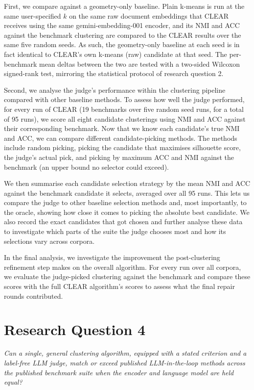 \documentclass[11pt,a4paper,oneside]{report}
\begin{document}
First, we compare against a geometry-only baseline. Plain k-means is run at the same user-specified $k$ on the same raw document embeddings that CLEAR receives using the same {\small\ttfamily gemini-embedding-001} encoder, and its NMI and ACC against the benchmark clustering are compared to the CLEAR results over the same five random seeds. As such, the geometry-only baseline at each seed is in fact identical to CLEAR's own k-means (raw) candidate at that seed. The per-benchmark mean deltas between the two are tested with a two-sided Wilcoxon signed-rank test, mirroring the statistical protocol of research question 2.

Second, we analyse the judge's performance within the clustering pipeline compared with other baseline methods. To assess how well the judge performed, for every run of CLEAR (19 benchmarks over five random seed runs, for a total of 95 runs), we score all eight candidate clusterings using NMI and ACC against their corresponding benchmark. Now that we know each candidate's true NMI and ACC, we can compare different candidate-picking methods. The methods include random picking, picking the candidate that maximises silhouette score, the judge's actual pick, and picking by maximum ACC and NMI against the benchmark (an upper bound no selector could exceed).

We then summarise each candidate selection strategy by the mean NMI and ACC against the benchmark candidate it selects, averaged over all 95 runs. This lets us compare the judge to other baseline selection methods and, most importantly, to the oracle, showing how close it comes to picking the absolute best candidate. We also record the exact candidates that got chosen and further analyse these data to investigate which parts of the suite the judge chooses most and how its selections vary across corpora.

In the final analysis, we investigate the improvement the post-clustering refinement step makes on the overall algorithm. For every run over all corpora, we evaluate the judge-picked clustering against the benchmark and compare these scores with the full CLEAR algorithm's scores to assess what the final repair rounds contributed.

\section{Research Question 4}

\emph{Can a single, general clustering algorithm, equipped with a stated criterion and a label-free LLM judge, match or exceed published LLM-in-the-loop methods across the published benchmark suite when the encoder and language model are held equal?}\\
\end{document}
